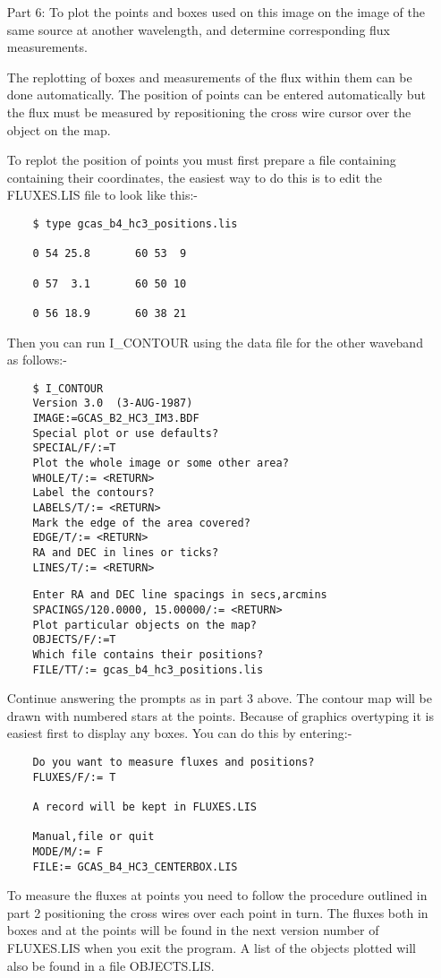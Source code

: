 \begin{itemize}
\item [Part 6:] To plot the points and boxes used on this image on the image of
the same source at another wavelength, and determine corresponding flux 
measurements.

The replotting of boxes and measurements of the flux within them can be done 
automatically. The position of points can be entered automatically but the 
flux must be measured by repositioning the cross wire cursor over the object
on the map.

To replot the position of points you must first prepare a file containing
containing their coordinates, the easiest way to do this is to edit the
FLUXES.LIS file to look like this:-

\begin{verbatim}
    $ type gcas_b4_hc3_positions.lis

    0 54 25.8       60 53  9

    0 57  3.1       60 50 10

    0 56 18.9       60 38 21
\end{verbatim}

Then you can run I\_CONTOUR using the data file for the other waveband as
follows:-

\begin{verbatim}
    $ I_CONTOUR
    Version 3.0  (3-AUG-1987)     
    IMAGE:=GCAS_B2_HC3_IM3.BDF
    Special plot or use defaults?
    SPECIAL/F/:=T
    Plot the whole image or some other area?
    WHOLE/T/:= <RETURN>
    Label the contours?
    LABELS/T/:= <RETURN>
    Mark the edge of the area covered?
    EDGE/T/:= <RETURN>
    RA and DEC in lines or ticks?
    LINES/T/:= <RETURN>
\end{verbatim}
\pagebreak
\begin{verbatim}
    Enter RA and DEC line spacings in secs,arcmins
    SPACINGS/120.0000, 15.00000/:= <RETURN>
    Plot particular objects on the map?
    OBJECTS/F/:=T
    Which file contains their positions?
    FILE/TT/:= gcas_b4_hc3_positions.lis
\end{verbatim}
Continue answering the prompts as in part 3 above. The contour map will be 
drawn with numbered stars at the points. Because of graphics overtyping it is
easiest first to display any boxes. You can do this by entering:-
\begin{verbatim}
    Do you want to measure fluxes and positions?
    FLUXES/F/:= T

    A record will be kept in FLUXES.LIS

    Manual,file or quit
    MODE/M/:= F
    FILE:= GCAS_B4_HC3_CENTERBOX.LIS
\end{verbatim}

To measure the fluxes at points you need to follow the procedure outlined
in part 2 positioning the cross wires over each point in turn. The fluxes both
in boxes and at the points will be found in the next version number of
FLUXES.LIS when you exit the program. A list of the objects plotted will also
be found in a file OBJECTS.LIS.
\end{itemize}

